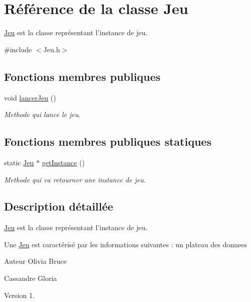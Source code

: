 \hypertarget{classJeu}{\section{\-Référence de la classe \-Jeu}
\label{classJeu}
}


\hyperlink{classJeu}{\-Jeu} est la classe représentant l'instance de jeu.  




{\ttfamily \#include $<$\-Jeu.\-h$>$}

\subsection*{\-Fonctions membres publiques}
\begin{DoxyCompactItemize}
\item 
\hypertarget{classJeu_a84033a99b3f0067d65cb3b4760e03ba6}{void \hyperlink{classJeu_a84033a99b3f0067d65cb3b4760e03ba6}{lancer\-Jeu} ()}\label{classJeu_a84033a99b3f0067d65cb3b4760e03ba6}

\begin{DoxyCompactList}\small\item\em \-Methode qui lance le jeu. \end{DoxyCompactList}\end{DoxyCompactItemize}
\subsection*{\-Fonctions membres publiques statiques}
\begin{DoxyCompactItemize}
\item 
static \hyperlink{classJeu}{\-Jeu} $\ast$ \hyperlink{classJeu_a7be6cc9a180fd4c1e428ce74ff46e15e}{get\-Instance} ()
\begin{DoxyCompactList}\small\item\em \-Methode qui va retourner une instance de jeu. \end{DoxyCompactList}\end{DoxyCompactItemize}


\subsection{\-Description détaillée}
\hyperlink{classJeu}{\-Jeu} est la classe représentant l'instance de jeu. 

\-Une \hyperlink{classJeu}{\-Jeu} est caractérisé par les informations suivantes \-: un plateau des donnees

\begin{DoxyAuthor}{\-Auteur}
\-Olivia \-Bruce 

\-Cassandre \-Gloria 
\end{DoxyAuthor}
\begin{DoxyVersion}{\-Version}
1. 
\end{DoxyVersion}


